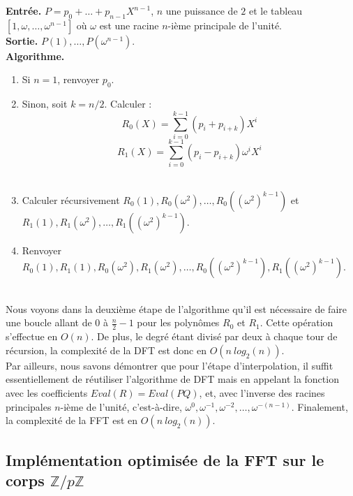 \documentclass[12pt, a4paper]{article}
\begin{document}
\begin{tcolorbox}[colback=cyan!5!white,
                  colframe=cyan!100!black,
                  title=\textbf{Algorithme DFT}
                 ]
\textbf{Entrée.} $P = p_0+\dots+p_{n-1}X^{n-1}$, $n$ une puissance de $2$ et le tableau $[1, \omega,\dots,\omega^{n-1}]$ où $\omega$ est une racine $n$-ième principale de l'unité.\\
\textbf{Sortie.} $P(1),\dots,P(\omega^{n-1})$.\\
\textbf{Algorithme.}
\begin{enumerate}[itemsep=-2ex]
\item\textit{}Si $n=1$, renvoyer $p_0$. \\
\item\textit{}Sinon, soit $k=n/2$. Calculer : \\
\[ R_0(X) = \sum_{i=0}^{k-1}(p_i+p_{i+k})X^i \]
\[ R_1(X) = \sum_{i=0}^{k-1}(p_i-p_{i+k})\omega^iX^i \] \\
\item\textit{}Calculer récursivement $R_0(1), R_0(\omega^2),\dots,R_0((\omega^2)^{k-1})$ et \\ $R_1(1), R_1(\omega^2),\dots,R_1((\omega^2)^{k-1})$. \\
\item\textit{}Renvoyer $R_0(1), R_1(1), R_0(\omega^2), R_1(\omega^2),\dots, R_0((\omega^2)^{k-1}), R_1((\omega^2)^{k-1})$.
\end{enumerate}
\end{tcolorbox}
\ \\
Nous voyons dans la deuxième étape de l'algorithme qu'il est nécessaire de faire une boucle allant de 0 à $\frac{n}{2}-1$ pour les polynômes $R_0$ et $R_1$. Cette opération s'effectue en $O(n)$. De plus, le degré étant divisé par deux à chaque tour de récursion, la complexité de la DFT est donc en $O(n\ log_2(n))$. \\
\indent Par ailleurs, nous savons démontrer que pour l'étape d'interpolation, il suffit essentiellement de réutiliser l'algorithme de DFT mais en appelant la fonction avec les coefficients $Eval(R)=Eval(PQ)$, et, avec l'inverse des racines principales $n$-ième de l'unité, c'est-à-dire, $\omega^{0},\omega^{-1},\omega^{-2},\dots,\omega^{-(n-1)}$. Finalement, la complexité de la FFT est en $O(n\ log_2(n))$.

\subsection{Implémentation optimisée de la FFT sur le corps $\mathbb{Z}/p\mathbb{Z}$}
\end{document}
